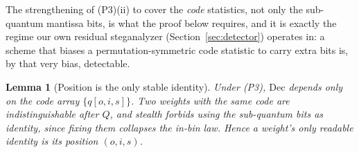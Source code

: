 \documentclass[a4paper,fleqn]{cas-dc}
\theoremstyle{plain}
\newtheorem{lemma}{Lemma}
\theoremstyle{remark}
\begin{document}
The strengthening of (P3)(ii) to cover the \emph{code} statistics, not only the sub-quantum
mantissa bits, is what the proof below requires, and it is exactly the regime our own residual
steganalyzer (Section~\ref{sec:detector}) operates in: a scheme that biases a permutation-symmetric
code statistic to carry extra bits is, by that very bias, detectable.

\begin{lemma}[Position is the only stable identity]\label{lem:pos}
Under \textup{(P3)}, $\mathrm{Dec}$ depends only on the code array $\{q[o,i,s]\}$.
Two weights with the same code are indistinguishable after $Q$, and stealth forbids
using the sub-quantum bits as identity, since fixing them collapses the in-bin law.
Hence a weight's only readable identity is its position $(o,i,s)$.
\end{lemma}
\end{document}
